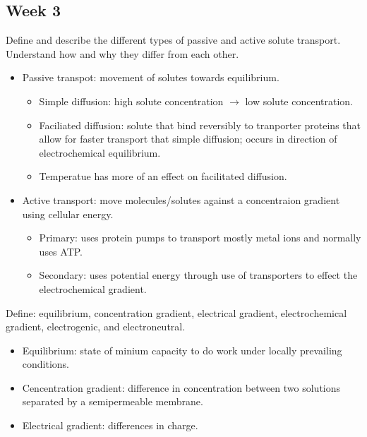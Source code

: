 \documentclass[12pt,a4paper]{article}
\begin{document}
\subsection{Week 3}
\begin{itemize}
    {\color{G-Moon}\item Define and describe the different types of passive and active solute transport. Understand how and why they differ from each other.}
        \begin{itemize}
            \item Passive transpot: movement of solutes towards equilibrium.
                \begin{itemize}
                    \item Simple diffusion: high solute concentration $\rightarrow$ low solute concentration.
                    \item Faciliated diffusion: solute that bind reversibly to tranporter proteins that allow for faster transport that simple diffusion; occurs in direction of electrochemical equilibrium.
                    \item Temperatue has more of an effect on facilitated diffusion.
                \end{itemize}
            \item Active transport: move molecules/solutes against a concentraion gradient using cellular energy.
                \begin{itemize}
                    \item Primary: uses protein pumps to transport mostly metal ions and normally uses ATP.
                    \item Secondary: uses potential energy through use of transporters to effect the electrochemical gradient.
                \end{itemize}
        \end{itemize}
    {\color{G-Moon}\item Define: equilibrium, concentration gradient, electrical gradient, electrochemical gradient, electrogenic, and electroneutral. }
        \begin{itemize}
            \item Equilibrium: state of minium capacity to do work under locally prevailing conditions.
            \item Cencentration gradient: difference in concentration between two solutions separated by a semipermeable membrane.
            \item Electrical gradient: differences in charge.

\end{itemize}
\end{itemize}
\end{document}
